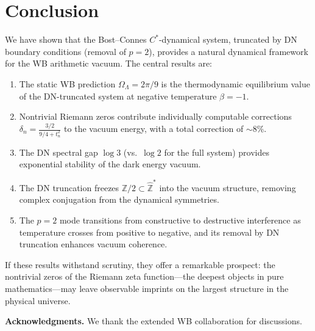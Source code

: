\documentclass[12pt,a4paper]{article}
\newcommand{\OL}{\Omega_\Lambda}
\newcommand{\Zhat}{\hat{\mathbb{Z}}}
\begin{document}
\section{Conclusion}
\label{sec:conclusion}

We have shown that the Bost--Connes $C^*$-dynamical system, truncated by DN boundary conditions (removal of $p=2$), provides a natural dynamical framework for the WB arithmetic vacuum. The central results are:

\begin{enumerate}
\item The static WB prediction $\OL = 2\pi/9$ is the thermodynamic equilibrium value of the DN-truncated system at negative temperature $\beta = -1$.

\item Nontrivial Riemann zeros contribute individually computable corrections $\delta_n = \frac{3/2}{9/4+t_n^2}$ to the vacuum energy, with a total correction of $\sim 8\%$.

\item The DN spectral gap $\log 3$ (vs.\ $\log 2$ for the full system) provides exponential stability of the dark energy vacuum.

\item The DN truncation freezes $\mathbb{Z}/2 \subset \Zhat^*$ into the vacuum structure, removing complex conjugation from the dynamical symmetries.

\item The $p=2$ mode transitions from constructive to destructive interference as temperature crosses from positive to negative, and its removal by DN truncation enhances vacuum coherence.
\end{enumerate}

If these results withstand scrutiny, they offer a remarkable prospect: the nontrivial zeros of the Riemann zeta function---the deepest objects in pure mathematics---may leave observable imprints on the largest structure in the physical universe.

\bigskip

\noindent\textbf{Acknowledgments.} We thank the extended WB collaboration for discussions.
\end{document}
